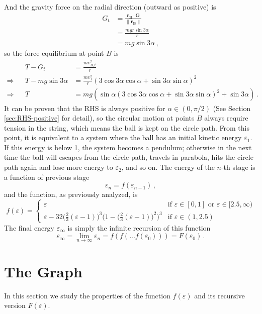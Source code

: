 \documentclass[]{article}
\begin{document}
And the gravity force on the radial direction (outward as positive) is
\begin{align*}
G_t &= \frac{\mathbf{r_B}\cdot\mathbf{G}}{\|\mathbf{r_B}\|}\\
 &=\frac{mgr\sin3\alpha}{r}\\
 &=mg\sin3\alpha\,,
\end{align*}
so the force equilibrium at point $B$ is
\begin{align*}
&&T - G_t &= \frac{mv_{B,t}^2}{r}  \\
\Rightarrow &&T - mg\sin3\alpha &= \frac{mv_1^2}{r}(3\cos3\alpha\cos\alpha + \sin3\alpha\sin\alpha)^2 \\
\Rightarrow &&T &= mg(\sin\alpha(3\cos3\alpha\cos\alpha + \sin3\alpha\sin\alpha)^2+\sin3\alpha)\,.
\end{align*}
It can be proven that the RHS is always positive for $\alpha\in(0,\pi/2)$ (See Section \ref{sec:RHS-positive} for detail), so the circular motion at points $B$ always require tension in the string, which means the ball is kept on the circle path. From this point, it is equivalent to a system where the ball has an initial kinetic energy $\varepsilon_1$. If this energy is below 1, the system becomes a pendulum; otherwise in the next time the ball will escapes from the circle path, travels in parabola, hits the circle path again and lose more energy to $\varepsilon_2$, and so on. The energy of the $n$-th stage is a function of previous stage
\[
\varepsilon_n = f(\varepsilon_{n-1})\,,
\]
and the function, as previously analyzed, is
\[
f(\varepsilon) = \left\{ \begin{array}{ll}
\varepsilon & \textrm{if $\varepsilon \in [0, 1]$ or $\varepsilon \in [2.5, \infty)$} \\
\varepsilon -32 \Big(\frac{2}{3}(\varepsilon -1)\Big)^3 \Big(1-\Big(\frac{2}{3}(\varepsilon -1)\Big)^2\Big)^3 & \textrm{if $\varepsilon \in (1, 2.5)$}
\end{array}\right.
\]
The final energy $\varepsilon_\infty$ is simply the infinite recursion of this function
\[
\varepsilon_\infty=\lim\limits_{n\rightarrow\infty}\varepsilon_n = f(f(...f(\varepsilon_0))) = F(\varepsilon_0) \,.
\]

\section{The Graph}

In this section we study the properties of the function $f(\varepsilon)$ and its recursive version $F(\varepsilon)$.
\end{document}
